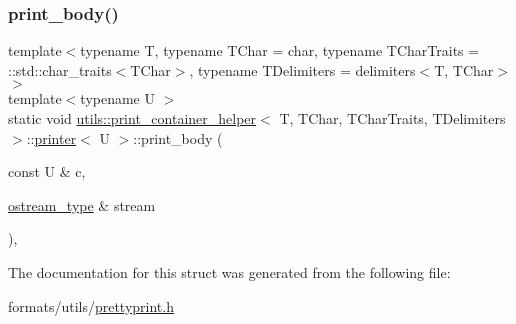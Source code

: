 \subsubsection{\texorpdfstring{print\_body()}{print\_body()}}
{\footnotesize\ttfamily template$<$typename T, typename T\+Char = char, typename T\+Char\+Traits = \+::std\+::char\+\_\+traits$<$\+T\+Char$>$, typename T\+Delimiters = delimiters$<$\+T, T\+Char$>$$>$ \\
template$<$typename U $>$ \\
static void \mbox{\hyperlink{structutils_1_1print__container__helper}{utils\+::print\+\_\+container\+\_\+helper}}$<$ T, T\+Char, T\+Char\+Traits, T\+Delimiters $>$\+::\mbox{\hyperlink{structutils_1_1print__container__helper_1_1printer}{printer}}$<$ U $>$\+::print\+\_\+body (\begin{DoxyParamCaption}\item[{const U \&}]{c,  }\item[{\mbox{\hyperlink{structutils_1_1print__container__helper_a49abcd9f1eb893c1389687f0c7de5811}{ostream\+\_\+type}} \&}]{stream }\end{DoxyParamCaption})\hspace{0.3cm}{\ttfamily [inline]}, {\ttfamily [static]}}



The documentation for this struct was generated from the following file\+:\begin{DoxyCompactItemize}
\item 
formats/utils/\mbox{\hyperlink{prettyprint_8h}{prettyprint.\+h}}\end{DoxyCompactItemize}
